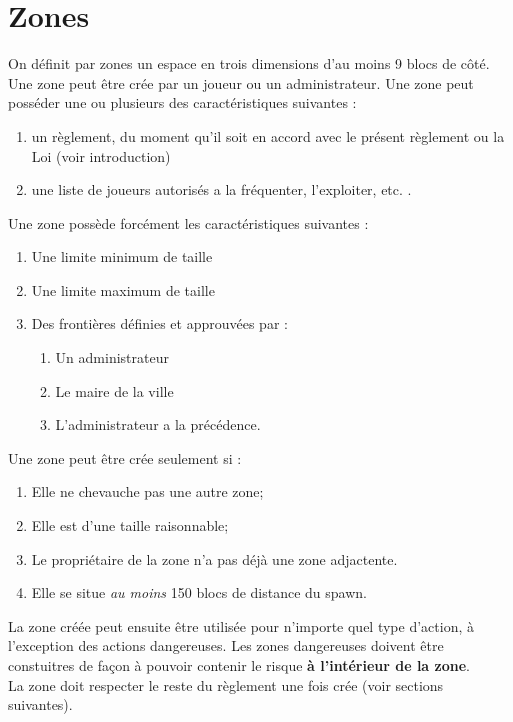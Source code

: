 \section{Zones}
\begin{flushleft}
	On d\'efinit par zones un espace en trois dimensions d'au moins 9 blocs de c\^ot\'e.\\
	Une zone peut \^etre cr\'ee par un joueur ou un administrateur. Une zone peut poss\'eder une ou plusieurs des caract\'eristiques suivantes :
	\begin{enumerate}
		\item un r\`eglement, du moment qu'il soit en accord avec le pr\'esent r\`eglement ou la Loi (voir introduction)
		\item une liste de joueurs autoris\'es a la fr\'equenter, l'exploiter, etc. .
	\end{enumerate}
	Une zone poss\`ede forc\'ement les caract\'eristiques suivantes :
	\begin{enumerate}
		\item Une limite minimum de taille
		\item Une limite maximum de taille
		\item Des fronti\`eres d\'efinies et approuv\'ees par :
		\begin{enumerate}
			\item Un administrateur
			\item Le maire de la ville
			\item L'administrateur a la pr\'ec\'edence.
		\end{enumerate}
	\end{enumerate}
	Une zone peut \^etre cr\'ee seulement si :
	\begin{enumerate}
		\item Elle ne chevauche pas une autre zone;
		\item Elle est d'une taille raisonnable;
		\item Le propri\'etaire de la zone n'a pas d\'ej\`a une zone adjactente.
		\item Elle se situe  \textit{au moins} 150 blocs de distance du spawn.
	\end{enumerate}
	La zone cr\'e\'ee peut ensuite \^etre utilis\'ee pour n'importe quel type d'action, \`a l'exception des actions dangereuses. Les zones dangereuses doivent \^etre constuitres de fa\c con \`a pouvoir contenir le risque \textbf{\`a l'int\'erieur de la zone}. \\
	La zone doit respecter le reste du r\`eglement une fois cr\'ee (voir sections suivantes).
\end{flushleft}
